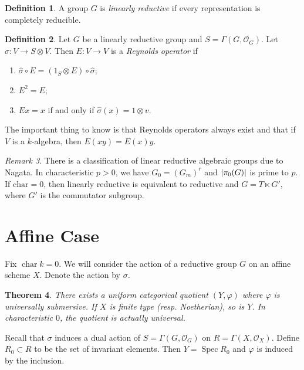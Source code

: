 \documentclass[leqno, openany]{memoir}
\newtheorem{thm}{Theorem}[section]
\theoremstyle{definition}
\newtheorem{defn}[thm]{Definition}
\theoremstyle{remark}
\newtheorem{rmk}[thm]{Remark}
\theoremstyle{plain}
\theoremstyle{definition}
\theoremstyle{remark}
\newcommand{\mc}[1]{\mathcal{#1}}
\newcommand{\mr}[1]{\mathrm{#1}}
\newcommand{\wh}[1]{\widehat{#1}}
\DeclareMathOperator{\Spec}{Spec}
\begin{document}
\begin{defn}
    A group $G$ is \textit{linearly reductive} if every representation is completely reducible. 
\end{defn}

\begin{defn}
    Let $G$ be a linearly reductive group and $S = \Gamma(G, \mc{O}_G)$. Let $\wh{\sigma} \colon V \to S \otimes V$. Then $E \colon V \to V$ is a \textit{Reynolds operator} if
    \begin{enumerate}
        \item $\wh{\sigma} \circ E = (1_S \otimes E) \circ \wh{\sigma}$;
        \item $E^2 = E$;
        \item $Ex=x$ if and only if $\wh{\sigma}(x) = 1 \otimes v$.
    \end{enumerate}
\end{defn}

The important thing to know is that Reynolds operators always exist and that if $V$ is a $k$-algebra, then $E(xy) = E(x)y$.

\begin{rmk}
    There is a classification of linear reductive algebraic groups due to Nagata. In characteristic $p > 0$, we have $G_0 = (G_m)^r$ and $\abs{\pi_0(G)}$ is prime to $p$. If $\mr{char} = 0$, then linearly reductive is equivalent to reductive and $G = T \ltimes G'$, where $G'$ is the commutator subgroup.
\end{rmk}

\section{Affine Case}%
\label{sec:affine_case}

Fix $\operatorname{char} k = 0$. We will consider the action of a reductive group $G$ on an affine scheme $X$. Denote the action by $\sigma$.

\begin{thm}
    There exists a uniform categorical quotient $(Y, \varphi)$ where $\varphi$ is universally submersive. If $X$ is finite type (resp. Noetherian), so is $Y$. In characteristic $0$, the quotient is actually universal.
\end{thm}

Recall that $\sigma$ induces a dual action of $S = \Gamma(G, \mc{O}_G)$ on $R = \Gamma(X, \mc{O}_X)$. Define $R_0 \subset R$ to be the set of invariant elements. Then $Y = \Spec R_0$ and $\varphi$ is induced by the inclusion.
\end{document}
